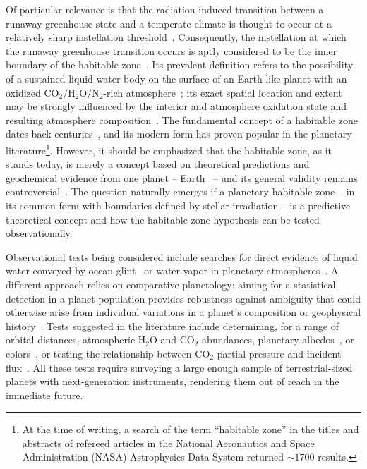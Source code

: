 \documentclass[twocolumn,twocolappendix,linenumbers]{aastex631}
\begin{document}
Of particular relevance is that the radiation-induced transition between a runaway greenhouse state and a temperate climate is thought to occur at a relatively sharp instellation threshold~\citep{Goldblatt2013,Leconte2013,Kopparapu2013}.
Consequently, the instellation at which the runaway greenhouse transition occurs is aptly considered to be the inner boundary of the habitable zone~\citep[e.g.,][]{Ramirez2018,Salvador2023b}.
Its prevalent definition refers to the possibility of a sustained liquid water body on the surface of an Earth-like planet with an oxidized CO$_2$/H$_2$O/N$_2$-rich atmosphere~\citep[][]{Kasting1993,Kopparapu2013,Kopparapu2014};
its exact spatial location and extent may be strongly influenced by the interior and atmosphere oxidation state and resulting atmosphere composition~\citep{2011ApJ...734L..13P,2017ApJ...837L...4R,2018ApJ...858...72R,2019ApJ...875...31K,2020ApJ...896..115G,2022JGRE..12707456G,2023ApJ...942L..20H}.
The fundamental concept of a habitable zone dates back centuries~\citep{Newton1687,Whewell1858,Shapley1953,Huang1959}, and its modern form has proven popular in the planetary literature\footnote{At the time of writing, a search of the term ``habitable zone'' in the titles and abstracts of refereed articles in the National Aeronautics and Space Administration (NASA) Astrophysics Data System returned $\sim\num{1700}$ results.}.
However, it should be emphasized that the habitable zone, as it stands today, is merely a concept based on theoretical predictions and geochemical evidence from one planet -- Earth~\citep{2020SciA....6.1420C} -- and its general validity remains controversial~\citep[e.g.,][]{Cockell2016,Moore2017,Tuchow2023}.
The question naturally emerges if a planetary habitable zone -- in its common form with boundaries defined by stellar irradiation -- is a predictive theoretical concept and how the habitable zone hypothesis can be tested observationally.

Observational tests being considered include searches for direct evidence of liquid water conveyed by ocean glint~\citep{Williams2008,Robinson2010,Lustig-Yaeger2018} or water vapor in planetary atmospheres~\citep{Suissa2020}.
A different approach relies on comparative planetology:
aiming for a statistical detection in a planet population provides robustness against ambiguity that could otherwise arise from individual variations in a planet's composition or geophysical history~\citep{Checlair2019,Apai2019a}.
Tests suggested in the literature include determining, for a range of orbital distances, atmospheric H$_{2}$O and CO$_2$ abundances, planetary albedos~\citep{Bean2017,Bixel2021}, or colors~\citep{Crow2011,Bixel2020}, or testing the relationship between CO$_2$ partial pressure and incident flux~\citep{Lehmer2020}.
All these tests require surveying a large enough sample of terrestrial-sized planets with next-generation instruments, rendering them out of reach in the immediate future.
\end{document}
